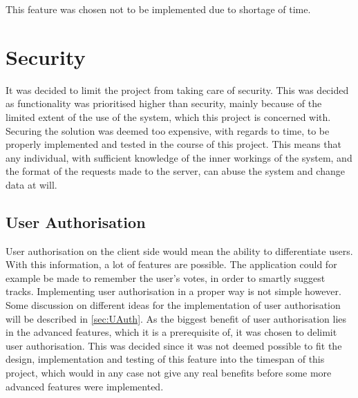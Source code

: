 This feature was chosen not to be implemented due to shortage of time.

\section{Security}
It was decided to limit the project from taking care of security. This was decided as functionality was prioritised higher than security, mainly because of the limited extent of the use of the system, which this project is concerned with. Securing the solution was deemed too expensive, with regards to time, to be properly implemented and tested in the course of this project.
This means that any individual, with sufficient knowledge of the inner workings of the system, and the format of the requests made to the server, can abuse the system and change data at will.

\subsection{User Authorisation}
\label{par:user_authorization}
User authorisation on the client side would mean the ability to differentiate users. With this information, a lot of features are possible. The application could for example be made to remember the user's votes, in order to smartly suggest tracks.
Implementing user authorisation in a proper way is not simple however. Some discussion on different ideas for the implementation of user authorisation will be described in \cref{sec:UAuth}.
As the biggest benefit of user authorisation lies in the advanced features, which it is a prerequisite of, it was chosen to delimit user authorisation. This was decided since it was not deemed possible to fit the design, implementation and testing of this feature into the timespan of this project, which would in any case not give any real benefits before some more advanced features were implemented.
